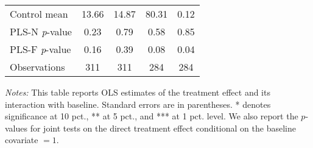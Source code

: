 \begin{table}[ht]
{\begin{threeparttable}
\begin{tabular}{l*{4}{c}}
Control mean    &    13.66         &    14.87         &    80.31         &     0.12         \\
PLS-N \emph{p}-value&     0.23         &     0.79         &     0.58         &     0.85         \\
PLS-F \emph{p}-value&     0.16         &     0.39         &     0.08         &     0.04         \\
Observations    &      311         &      311         &      284         &      284         \\
\bottomrule \end{tabular} \begin{tablenotes}[flushleft] \footnotesize \item \emph{Notes:} This table reports OLS estimates of the treatment effect and its interaction with baseline. Standard errors are in parentheses. * denotes significance at 10 pct., ** at 5 pct., and *** at 1 pct. level. We also report the \(p\)-values for joint tests on the direct treatment effect conditional on the baseline covariate $= 1$. \end{tablenotes} \end{threeparttable} } \end{table}

